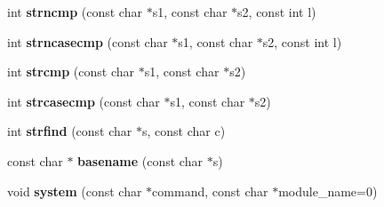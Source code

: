 \begin{DoxyCompactItemize}
\item 
\hypertarget{namespacecimg__library_1_1cimg_a605999871c7480ae5374eb7c22b36d2b}{
int {\bfseries strncmp} (const char $\ast$s1, const char $\ast$s2, const int l)}
\label{namespacecimg__library_1_1cimg_a605999871c7480ae5374eb7c22b36d2b}

\item 
\hypertarget{namespacecimg__library_1_1cimg_aeafd7eca641a77ede586f28ca2f224ec}{
int {\bfseries strncasecmp} (const char $\ast$s1, const char $\ast$s2, const int l)}
\label{namespacecimg__library_1_1cimg_aeafd7eca641a77ede586f28ca2f224ec}

\item 
\hypertarget{namespacecimg__library_1_1cimg_aa023adc89abf37f3b1c641c3074888cd}{
int {\bfseries strcmp} (const char $\ast$s1, const char $\ast$s2)}
\label{namespacecimg__library_1_1cimg_aa023adc89abf37f3b1c641c3074888cd}

\item 
\hypertarget{namespacecimg__library_1_1cimg_acc46f540ac830d8ea966da95d4d618f6}{
int {\bfseries strcasecmp} (const char $\ast$s1, const char $\ast$s2)}
\label{namespacecimg__library_1_1cimg_acc46f540ac830d8ea966da95d4d618f6}

\item 
\hypertarget{namespacecimg__library_1_1cimg_a979e920469e2ac90140fbdb70af0cfd8}{
int {\bfseries strfind} (const char $\ast$s, const char c)}
\label{namespacecimg__library_1_1cimg_a979e920469e2ac90140fbdb70af0cfd8}

\item 
\hypertarget{namespacecimg__library_1_1cimg_a1bc01331ce0d8b220644830d027019a0}{
const char $\ast$ {\bfseries basename} (const char $\ast$s)}
\label{namespacecimg__library_1_1cimg_a1bc01331ce0d8b220644830d027019a0}

\item 
\hypertarget{namespacecimg__library_1_1cimg_a63683d56e98ba23eb5a94a1999168c9f}{
void {\bfseries system} (const char $\ast$command, const char $\ast$module\_\-name=0)}
\label{namespacecimg__library_1_1cimg_a63683d56e98ba23eb5a94a1999168c9f}


\end{DoxyCompactItemize}
